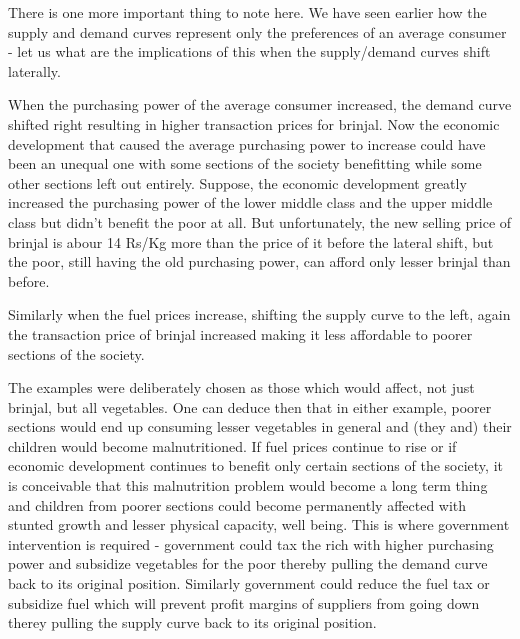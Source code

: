 	There is one more important thing to note here. We have seen earlier how the supply and demand curves represent only the preferences of an average consumer - let us what are the implications of this when the supply/demand curves shift laterally. 
	
When the purchasing power of the average consumer increased, the demand curve shifted right resulting in higher transaction prices for brinjal. Now the economic development that caused the average purchasing power to increase could have been an unequal one with some sections of the society benefitting while some other sections left out entirely. Suppose, the economic development greatly increased the purchasing power of the lower middle class and the upper middle class but didn't benefit the poor at all. But unfortunately, the new selling price of brinjal is abour 14 Rs/Kg more than the price of it before the lateral shift, but the poor, still having the old purchasing power, can afford only lesser brinjal than before. 

Similarly when the fuel prices increase, shifting the supply curve to the left, again the transaction price of brinjal increased making it less affordable to poorer sections of the society.

The examples were deliberately chosen as those which would affect, not just brinjal, but all vegetables. One can deduce then that in either example, poorer sections would end up consuming lesser vegetables in general and (they and) their children would become malnutritioned. If fuel prices continue to rise or if economic development continues to benefit only certain sections of the society, it is conceivable that this malnutrition problem would become a long term thing and children from poorer sections could become permanently affected with stunted growth and lesser physical capacity, well being. This is where government intervention is required - government could tax the rich with higher purchasing power and subsidize vegetables for the poor thereby pulling the demand curve back to its original position. Similarly government could reduce the fuel tax or subsidize fuel which will prevent profit margins of suppliers from going down therey pulling the supply curve back to its original position.

